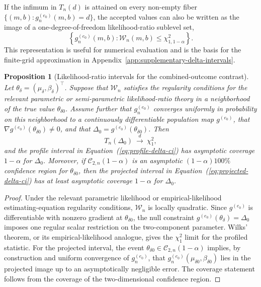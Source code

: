 \documentclass[11pt]{article}
\newtheorem{proposition}{Proposition}
\begin{document}
If the infimum in $T_n(d)$ is attained on every non-empty fiber $\{(m,b):g_n^{(e_0)}(m,b)=d\}$, the accepted values can also be written as the image of a one-degree-of-freedom likelihood-ratio sublevel set,
\[
  \left\{
    g_n^{(e_0)}(m,b):
    \mathcal{W}_n(m,b)\leq\chi^2_{1,1-\alpha}
  \right\}.
\]
This representation is useful for numerical evaluation and is the basis for the finite-grid approximation in Appendix~\ref{app:supplementary-delta-intervals}.

\begin{proposition}[Likelihood-ratio intervals for the combined-outcome contrast]\label{prop:delta-lr-intervals}
Let $\theta_\delta=(\mu_\delta,\beta_\delta)^\top$. Suppose that $\mathcal{W}_n$ satisfies the regularity conditions for the relevant parametric or semi-parametric likelihood-ratio theory in a neighborhood of the true value $\theta_{\delta0}$. Assume further that $g_n^{(e_0)}$ converges uniformly in probability on this neighborhood to a continuously differentiable population map $g^{(e_0)}$, that $\nabla g^{(e_0)}(\theta_{\delta0})\neq 0$, and that $\Delta_0=g^{(e_0)}(\theta_{\delta0})$. Then
\[
  T_n(\Delta_0)\ \overset{d}{\longrightarrow}\ \chi^2_1,
\]
and the profile interval in Equation~(\ref{eq:profile-delta-ci}) has asymptotic coverage $1-\alpha$ for $\Delta_0$. Moreover, if $\mathcal{C}_{2,n}(1-\alpha)$ is an asymptotic $(1-\alpha)100\%$ confidence region for $\theta_{\delta0}$, then the projected interval in Equation~(\ref{eq:projected-delta-ci}) has at least asymptotic coverage $1-\alpha$ for $\Delta_0$.
\end{proposition}

\begin{proof}
Under the relevant parametric likelihood or empirical-likelihood estimating-equation regularity conditions, $\mathcal{W}_n$ is locally quadratic. Since $g^{(e_0)}$ is differentiable with nonzero gradient at $\theta_{\delta0}$, the null constraint $g^{(e_0)}(\theta_\delta)=\Delta_0$ imposes one regular scalar restriction on the two-component parameter. Wilks' theorem, or its empirical-likelihood analogue, gives the $\chi^2_1$ limit for the profiled statistic. For the projected interval, the event $\theta_{\delta0}\in\mathcal{C}_{2,n}(1-\alpha)$ implies, by construction and uniform convergence of $g_n^{(e_0)}$, that $g_n^{(e_0)}(\mu_{\delta0},\beta_{\delta0})$ lies in the projected image up to an asymptotically negligible error. The coverage statement follows from the coverage of the two-dimensional confidence region.
\end{proof}
\end{document}
